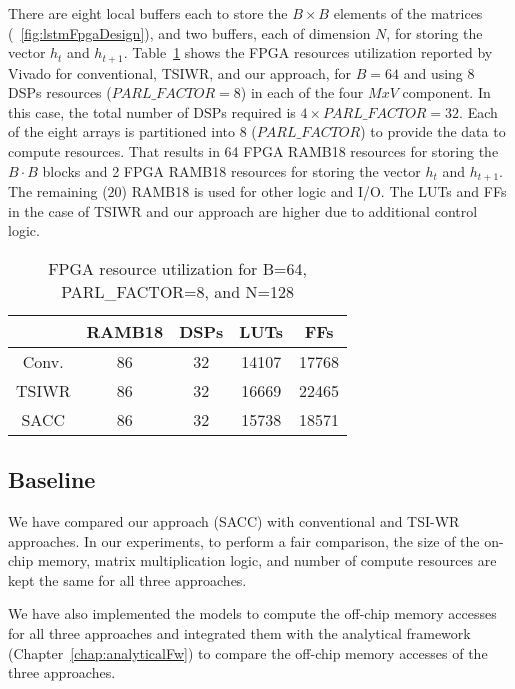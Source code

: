 {There are eight local buffers each to store the $B{\times}B$ elements of the matrices (\figurename{~\ref{fig:lstmFpgaDesign}}), and two buffers, each of dimension $N$, for storing the vector $h_t$ and $h_{t{+}1}$. Table~\ref{tab:fpgaResources} shows the FPGA resources utilization reported by Vivado for conventional, TSIWR, and our approach, for $B{=}64$ and using 8 DSPs resources ($PARL\_FACTOR{=}8$) in each of the four $MxV$ component. In this case, the total number of DSPs required is $4{\times}PARL\_FACTOR{=}32$.
Each of the eight arrays is partitioned into 8 ($PARL\_FACTOR$) to provide the data to compute resources. That results in 64 FPGA RAMB18 resources for storing the $B{\cdot}B$ blocks and 2 FPGA RAMB18 resources for storing the vector $h_t$ and $h_{t{+}1}$. The remaining ($20$) RAMB18 is used for other logic and I/O. The LUTs and FFs in the case of TSIWR and our approach are higher due to additional control logic.
\begin{table}[htb]
	\centering
	\caption{FPGA resource utilization for B=64, PARL\_FACTOR=8, and N=128 }
	\label{tab:fpgaResources}
	\begin{tabular}{ccccc}
		\hline
		& RAMB18 & DSPs & LUTs  & FFs   \\ \hline
		Conv. & 86     & 32   & 14107 & 17768 \\ \hline
		TSIWR & 86     & 32   & 16669 & 22465 \\ \hline
		SACC  & 86     & 32   & 15738 & 18571 \\ \hline
	\end{tabular}
\end{table}
\subsection{Baseline}
We have compared our approach (SACC) with conventional and TSI-WR~\cite{park2020time} approaches. In our experiments, to perform a fair comparison, the size of the on-chip memory, matrix multiplication logic, and number of compute resources are kept the same for all three approaches.

We have also implemented the models to compute the off-chip memory accesses for all three approaches and integrated them with the analytical framework (Chapter~\ref{chap:analyticalFw}) to compare the off-chip memory accesses of the three approaches.
}
